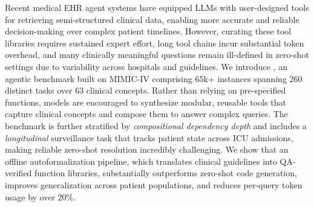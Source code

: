Recent medical EHR agent systems have equipped LLMs with user-designed tools for retrieving semi-structured clinical data, enabling more accurate and reliable decision-making over complex patient timelines. However, curating these tool libraries requires sustained expert effort, long tool chains incur substantial token overhead, and many clinically meaningful questions remain ill-defined in zero-shot settings due to variability across hospitals and guidelines. We introduce \ours{}, an agentic benchmark built on MIMIC-IV comprising 65k+ instances spanning 260 distinct tasks over 63 clinical concepts. Rather than relying on pre-specified functions, models are encouraged to synthesize modular, reusable tools that capture clinical concepts and compose them to answer complex queries. The benchmark is further stratified by \emph{compositional dependency depth} and includes a \emph{longitudinal} surveillance task that tracks patient state across ICU admissions, making reliable zero-shot resolution incredibly challenging. We show that an offline autoformalization pipeline, which translates clinical guidelines into QA-verified function libraries, substantially outperforms zero-shot code generation, improves generalization across patient populations, and reduces per-query token usage by over 20\%.